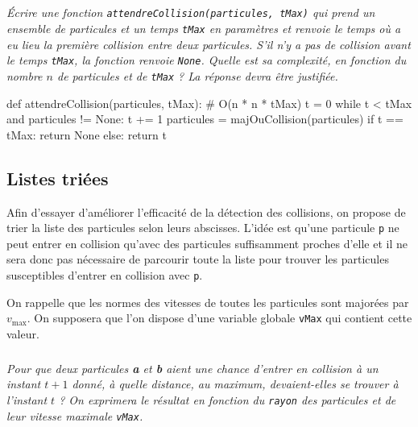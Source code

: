 \documentclass[10pt,fleqn]{article} %
\begin{document}
\subparagraph{}
\textit{Écrire une fonction \texttt{attendreCollision(particules, tMax)} qui prend un ensemble de particules et un temps \texttt{tMax} en paramètres et renvoie le temps où a eu lieu la première collision entre
deux particules. S'il n'y a pas de collision avant le temps \texttt{tMax}, la fonction renvoie \texttt{None}. Quelle
est sa complexité, en fonction du nombre $n$ de particules et de \texttt{tMax} ? La réponse devra être
justifiée.}
\ifprof
\begin{corrige}
\begin{python}
def attendreCollision(particules, tMax):
    # O(n * n * tMax)
    t = 0
    while t < tMax and particules != None:
        t += 1
        particules = majOuCollision(particules)
    if t == tMax:
        return None
    else:
        return t
\end{python}
\end{corrige}
\else
\fi


\subsection*{Listes triées}

Afin d'essayer d'améliorer l'efficacité de la détection des collisions, on propose de trier la liste des
particules selon leurs abscisses. L'idée est qu'une particule \texttt{p} ne peut entrer en collision qu'avec
des particules suffisamment proches d'elle et il ne sera donc pas nécessaire de parcourir toute
la liste pour trouver les particules susceptibles d'entrer en collision avec \texttt{p}.

On rappelle que les normes des vitesses de toutes les particules sont majorées par $v_{\text{max}}$. On
supposera que l'on dispose d'une variable globale \texttt{vMax} qui contient cette valeur.

\subparagraph{}
\textit{Pour que deux particules \textbf{a} et \textbf{b} aient une chance d'entrer en collision à un instant $t+1$ donné,
à quelle distance, au maximum, devaient-elles se trouver à l'instant $t$ ? On exprimera le résultat
en fonction du \texttt{rayon} des particules et de leur vitesse maximale \texttt{vMax}.}
\ifprof
\begin{corrige}
\begin{python}

\end{python}
\end{corrige}
\else
\fi
\end{document}
